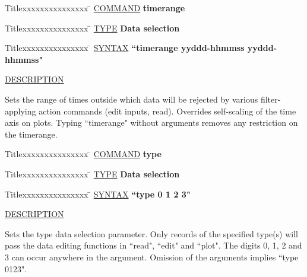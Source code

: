 \begin{tabbing}
Titlexxxxxxxxxxxxxxx \= \kill
\underline{COMMAND} \> {\bf 	timerange} \\
\end{tabbing}

\begin{tabbing}
Titlexxxxxxxxxxxxxxx \= \kill
\underline{TYPE} \> {\bf 		Data selection} \\
\end{tabbing}

\begin{tabbing}
Titlexxxxxxxxxxxxxxx \= \kill
\underline{SYNTAX} \> {\bf 		``timerange yyddd-hhmmss yyddd-hhmmss"} \\
\end{tabbing}

\underline{DESCRIPTION}
\begin{list}{}{\setlength{\leftmargin}{0.5in}
     \setlength{\rightmargin}{0in}}
\item
Sets the range of times outside which data will be rejected by
various filter-applying action commands (edit inputs, read).
Overrides self-scaling of the time axis on plots.  Typing
``timerange" without arguments removes any restriction on the
timerange.
\end{list}
\vspace{.2in}

\begin{tabbing}
Titlexxxxxxxxxxxxxxx \= \kill
\underline{COMMAND} \> {\bf 	type} \\
\end{tabbing}

\begin{tabbing}
Titlexxxxxxxxxxxxxxx \= \kill
\underline{TYPE} \> {\bf 		Data selection} \\
\end{tabbing}

\begin{tabbing}
Titlexxxxxxxxxxxxxxx \= \kill
\underline{SYNTAX} \> {\bf 		``type 0 1 2 3"} \\
\end{tabbing}

\underline{DESCRIPTION}
\begin{list}{}{\setlength{\leftmargin}{0.5in}
     \setlength{\rightmargin}{0in}}
\item
Sets the type data selection parameter.  Only records of the
specified type(s) will pass the data editing functions in ``read",
``edit" and ``plot".  The digits 0, 1, 2 and 3 can occur anywhere in the 
argument.  Omission of the arguments implies ``type 0123".
\end{list}
\vspace{.2in}


